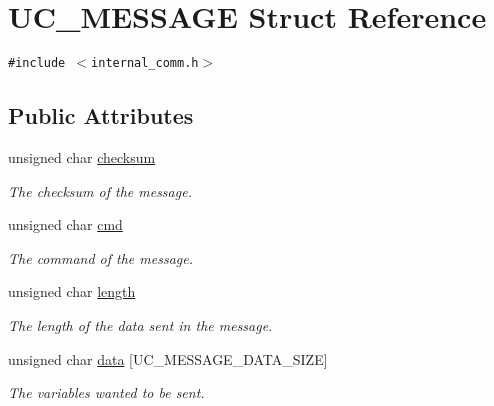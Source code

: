 \hypertarget{structUC__MESSAGE}{
\section{UC\_\-MESSAGE Struct Reference}
\label{structUC__MESSAGE}
}
{\tt \#include $<$internal\_\-comm.h$>$}

\subsection*{Public Attributes}
\begin{CompactItemize}
\item 
\hypertarget{structUC__MESSAGE_900eb9b6b89b78ac70e41054a55bf120}{
unsigned char \hyperlink{structUC__MESSAGE_900eb9b6b89b78ac70e41054a55bf120}{checksum}}
\label{structUC__MESSAGE_900eb9b6b89b78ac70e41054a55bf120}

\begin{CompactList}\small\item\em The checksum of the message. \item\end{CompactList}\item 
\hypertarget{structUC__MESSAGE_3e82a473028ef7702cc5d002878c84c7}{
unsigned char \hyperlink{structUC__MESSAGE_3e82a473028ef7702cc5d002878c84c7}{cmd}}
\label{structUC__MESSAGE_3e82a473028ef7702cc5d002878c84c7}

\begin{CompactList}\small\item\em The command of the message. \item\end{CompactList}\item 
\hypertarget{structUC__MESSAGE_223c3c1cfc7e81e0e91e29fa38a4c5a8}{
unsigned char \hyperlink{structUC__MESSAGE_223c3c1cfc7e81e0e91e29fa38a4c5a8}{length}}
\label{structUC__MESSAGE_223c3c1cfc7e81e0e91e29fa38a4c5a8}

\begin{CompactList}\small\item\em The length of the data sent in the message. \item\end{CompactList}\item 
\hypertarget{structUC__MESSAGE_adf6e14adf5a71b393442d03cfb063bc}{
unsigned char \hyperlink{structUC__MESSAGE_adf6e14adf5a71b393442d03cfb063bc}{data} \mbox{[}UC\_\-MESSAGE\_\-DATA\_\-SIZE\mbox{]}}
\label{structUC__MESSAGE_adf6e14adf5a71b393442d03cfb063bc}

\begin{CompactList}\small\item\em The variables wanted to be sent. \item\end{CompactList}\end{CompactItemize}


